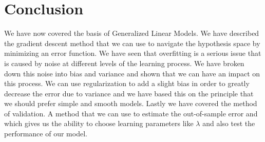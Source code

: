\section{Conclusion}
\label{sec:glm-conclusion}
We have now covered the basis of Generalized Linear Models. We have described the gradient descent method that we can use to navigate the hypothesis space by minimizing an error function. We have seen that overfitting is a serious issue that is caused by noise at different levels of the learning process. We have broken down this noise into bias and variance and shown that we can have an impact on this process. We can use regularization to add a slight bias in order to greatly decrease the error due to variance and we have based this on the principle that we should prefer simple and smooth models. Lastly we have covered the method of validation. A method that we can use to estimate the out-of-sample error and which gives us the ability to choose learning parameters like $\lambda$ and also test the performance of our model.

